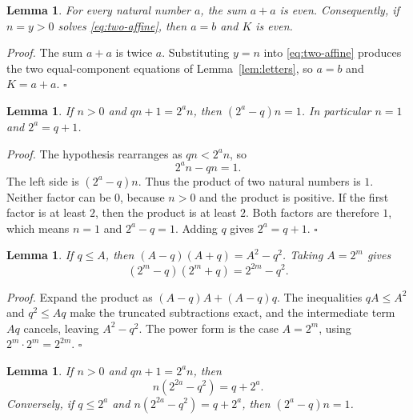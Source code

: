 \documentclass[11pt,letterpaper]{article}
\newtheorem{lemma}[theorem]{Lemma}
\newenvironment{proof}{\noindent\textit{Proof.}}{\hfill\(\square\)}
\begin{document}
\begin{lemma}
\label{lem:even-length}
For every natural number \(a\), the sum \(a + a\) is even. Consequently, if \(n = y > 0\) solves \eqref{eq:two-affine}, then \(a = b\) and \(K\) is even.
\end{lemma}

\begin{proof}
The sum \(a + a\) is twice \(a\). Substituting \(y = n\) into \eqref{eq:two-affine} produces the two equal-component equations of Lemma~\ref{lem:letters}, so \(a = b\) and \(K = a + a\).
\end{proof}

\begin{lemma}
\label{lem:cofactor}
If \(n > 0\) and \(q n + 1 = 2^{a} n\), then \((2^{a} - q) n = 1\). In particular \(n = 1\) and \(2^{a} = q + 1\).
\end{lemma}

\begin{proof}
The hypothesis rearranges as \(q n < 2^{a} n\), so
\[
2^{a} n - q n = 1.
\]
The left side is \((2^{a} - q) n\). Thus the product of two natural numbers is \(1\). Neither factor can be \(0\), because \(n > 0\) and the product is positive. If the first factor is at least \(2\), then the product is at least \(2\). Both factors are therefore \(1\), which means \(n = 1\) and \(2^{a} - q = 1\). Adding \(q\) gives \(2^{a} = q + 1\).
\end{proof}

\begin{lemma}
\label{lem:squares}
If \(q \le A\), then \((A - q)(A + q) = A^{2} - q^{2}\). Taking \(A = 2^{m}\) gives
\[
(2^{m} - q)(2^{m} + q) = 2^{2m} - q^{2}.
\]
\end{lemma}

\begin{proof}
Expand the product as \((A - q)A + (A - q)q\). The inequalities \(q A \le A^{2}\) and \(q^{2} \le A q\) make the truncated subtractions exact, and the intermediate term \(A q\) cancels, leaving \(A^{2} - q^{2}\). The power form is the case \(A = 2^{m}\), using \(2^{m} \cdot 2^{m} = 2^{2m}\).
\end{proof}

\begin{lemma}
\label{lem:seed}
If \(n > 0\) and \(q n + 1 = 2^{a} n\), then
\[
n(2^{2a} - q^{2}) = q + 2^{a}.
\]
Conversely, if \(q \le 2^{a}\) and \(n(2^{2a} - q^{2}) = q + 2^{a}\), then \((2^{a} - q) n = 1\).
\end{lemma}
\end{document}
